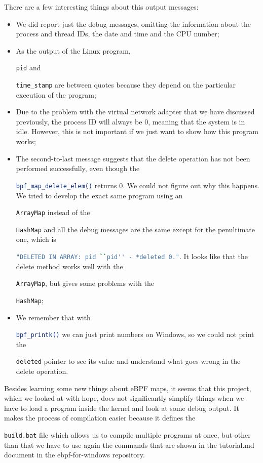There are a few interesting things about this output messages:

\begin{itemize}
	\item 
		We did report just the debug messages, omitting the information about the process and thread IDs, the date and time and the CPU number;
	\item 
		As the output of the Linux program, \raggedright\colorbox{backcolour}{\lstinline[style=commandline, language=bash]|pid|} and \raggedright\colorbox{backcolour}{\lstinline[style=commandline, language=bash]|time_stamp|} are between quotes because they depend on the particular execution of the program;
	\item 
		Due to the problem with the virtual network adapter that we have discussed previously, the process ID will always be 0, meaning that the system is in idle.
		However, this is not important if we just want to show how this program works;
	\item 
		The second-to-last message suggests that the delete operation has not been performed successfully, even though the \raggedright\colorbox{backcolour}{\lstinline[style=commandline, language=bash]|bpf_map_delete_elem()|} returns 0.
		We could not figure out why this happens.
		We tried to develop the exact same program using an \raggedright\colorbox{backcolour}{\lstinline[style=commandline, language=bash]|ArrayMap|} instead of the \raggedright\colorbox{backcolour}{\lstinline[style=commandline, language=bash]|HashMap|} and all the debug messages are the same except for the penultimate one, which is \raggedright\raggedright\colorbox{backcolour}{\lstinline[style=commandline, language=bash]|"DELETED IN ARRAY: pid ``pid'' - *deleted 0."|}.
		It looks like that the delete method works well with the \raggedright\colorbox{backcolour}{\lstinline[style=commandline, language=bash]|ArrayMap|}, but gives some problems with the \raggedright\colorbox{backcolour}{\lstinline[style=commandline, language=bash]|HashMap|};
	\item 
		We remember that with \raggedright\colorbox{backcolour}{\lstinline[style=commandline, language=bash]|bpf_printk()|} we can just print numbers on Windows, so we could not print the \raggedright\colorbox{backcolour}{\lstinline[style=commandline, language=bash]|deleted|} pointer to see its value and understand what goes wrong in the delete operation.
\end{itemize}

Besides learning some new things about eBPF maps, it seems that this project, which we looked at with hope, does not significantly simplify things when we have to load a program inside the kernel and look at some debug output.
It makes the process of compilation easier because it defines the \raggedright\colorbox{backcolour}{\lstinline[style=commandline, language=bash]|build.bat|} file which allows us to compile multiple programs at once, but other than that we have to use again the commands that are shown in the tutorial.md document in the ebpf-for-windows repository.

